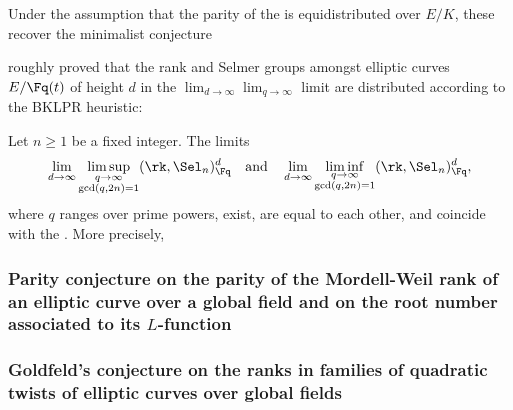 Under the assumption that the parity of the  is equidistributed over $E/K$, these recover the \CrefAndHyperrefIfExist{}{}minimalist conjecture






\cite{poonen_rains_rmissg}

\cite{feng_landesman_rains_gdsgecff} roughly proved that the rank and Selmer groups amongst elliptic curves $E/\Fq(t)$ of height $d$ in the $\lim_{d \to \infty} \lim_{q \to \infty}$ limit are distributed according to the BKLPR heuristic:
\begin{theorem}
    Let $n \geq 1$ be a fixed integer. The limits
    $$\lim_{d \to \infty} \limsup_{\substack{q \to \infty \\ \gcd(q,2n) = 1}} (\rk, \Sel_n)_{\Fq}^d \quad \text{and} \quad \lim_{d \to \infty} \liminf_{\substack{q \to \infty \\ \gcd(q,2n) = 1}} (\rk, \Sel_n)_{\Fq}^d,$$
     where $q$ ranges over prime powers, exist, are equal to each other, and coincide with the . More precisely,
\end{theorem}


\subsubsection{Parity conjecture on the parity of the Mordell-Weil rank of an elliptic curve over a global field and on the root number associated to its \texorpdfstring{$L$}{L}-function}

\subsubsection{Goldfeld's conjecture on the ranks in families of quadratic twists of elliptic curves over global fields}

